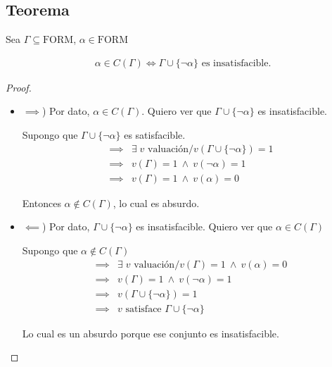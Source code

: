 \subsection{Teorema}

\begin{teorema}{}{}
    Sea $\Gamma \subseteq \mathrm{FORM}$, $\alpha \in \mathrm{FORM}$

    \medskip

    \begin{gather*}
        \alpha \in C(\Gamma) \iff 
        \Gamma \cup \{ \neg \alpha \} \text{ es insatisfacible.}
    \end{gather*}
\end{teorema}

\begin{proof} \phantom{.}

    \begin{itemize}
        \item $\implies$) Por dato, $\alpha \in C(\Gamma)$. Quiero ver que
            $\Gamma \cup \{ \neg \alpha \}$ es insatisfacible.

            Supongo que $\Gamma \cup \{ \neg \alpha \}$ es satisfacible.
            \begin{align*}
                \implies& \exists  \; v \text{ valuación}/
                v\left(\Gamma \cup \{ \neg\alpha \}\right) = 1 \\
                \implies& v(\Gamma) = 1 ~ \wedge ~ v(\neg \alpha) = 1 \\
                \implies& v(\Gamma) = 1 ~ \wedge ~ v(\alpha) = 0
            \end{align*}

            Entonces $\alpha \notin C(\Gamma)$, lo cual es absurdo.

        \item $\impliedby$) Por dato, $\Gamma \cup \{ \neg\alpha \}$ es
            insatisfacible. Quiero ver que $\alpha \in C(\Gamma)$

            Supongo que $\alpha \notin C(\Gamma)$
            \begin{align*}
                \implies& \exists \; v \text{ valuación}/ v(\Gamma)=1 
                ~ \wedge ~ v(\alpha)= 0 \\
                \implies& v(\Gamma) = 1 ~ \wedge ~ v(\neg \alpha)=1 \\
                \implies& v(\Gamma \cup \{ \neg \alpha \}) = 1 \\
                \implies& v \text{ satisface } \Gamma \cup \{ \neg\alpha \}
            \end{align*}

            Lo cual es un absurdo porque ese conjunto es insatisfacible.
    \end{itemize}
\end{proof}

